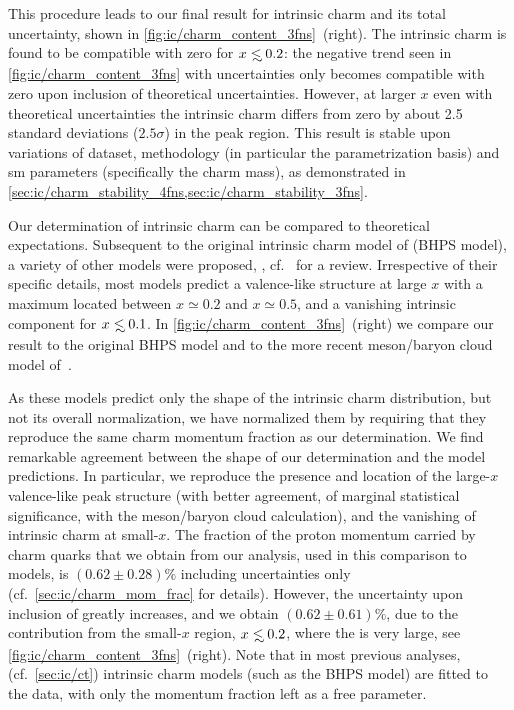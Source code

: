 This procedure leads to our final result for intrinsic charm and its total
uncertainty, shown in \cref{fig:ic/charm_content_3fns}~(right).
%
The intrinsic charm \pdf is found to be compatible with zero for $x\lsim 0.2$:
the negative trend seen in \cref{fig:ic/charm_content_3fns} with \pdf
uncertainties only becomes compatible with zero upon inclusion of  theoretical
uncertainties.
However, at larger $x$ even with theoretical uncertainties the intrinsic charm
\pdf differs from zero by about 2.5 standard deviations ($2.5\sigma$) in the
peak region.
%
This result is stable upon variations of dataset, methodology (in particular
the \pdf  parametrization basis) and \acrlong{sm} parameters (specifically the
charm mass), as demonstrated in
\cref{sec:ic/charm_stability_4fns,sec:ic/charm_stability_3fns}. 

Our determination of intrinsic charm can be compared to theoretical
expectations.
%
Subsequent to the original intrinsic charm model of \cite{Brodsky:1980pb} (BHPS
model), a variety of other models were   proposed, 
\cite{Hoffmann:1983ah,Pumplin:2005yf,Paiva:1996dd,Steffens:1999hx,Hobbs:2013bia},
cf.\ \cite{Brodsky:2015fna} for a review.
%
Irrespective of their specific details, most models predict a valence-like
structure at large $x$ with a maximum located between $x\simeq 0.2$ and
$x\simeq 0.5$, and a vanishing intrinsic component for $x\lsim 0.1$.
%
In \cref{fig:ic/charm_content_3fns}~(right) we compare our result to
the original BHPS model and to the more recent meson/baryon cloud model
of~\cite{Hobbs:2013bia}.

As these models predict only the shape of the intrinsic charm distribution, but
not its overall normalization, we have normalized them by requiring that they
reproduce the same  charm momentum fraction as our determination.
%
We find remarkable agreement between the shape of our  determination and the
model predictions.
%
In particular, we reproduce  the presence and location of the large-$x$
valence-like peak structure (with  better agreement, of marginal statistical
significance, with the meson/baryon cloud calculation),  and the vanishing of 
intrinsic charm at small-$x$.
%
The fraction of the proton momentum carried by charm quarks that we obtain from
our analysis, used in this comparison to models, is $\left( 0.62 \pm
0.28\right) \%$ including \pdf uncertainties only (cf.\
\cref{sec:ic/charm_mom_frac} for details).
%
However, the uncertainty upon inclusion of \mhou greatly increases, and we
obtain $\left( 0.62 \pm 0.61\right) \%$, due to the contribution from the
small-$x$ region, $x\lsim 0.2$, where the \mhou is very large, see
\cref{fig:ic/charm_content_3fns}~(right).
%
Note that in most previous analyses, \cite{Hou:2017khm} (cf.\ \cref{sec:ic/ct})
intrinsic charm models (such as the BHPS model) are fitted to the data, with
only the momentum fraction left as a free parameter.

